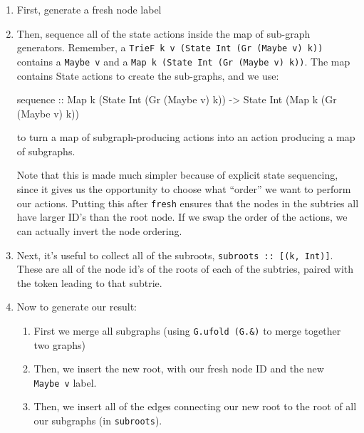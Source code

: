 \documentclass[]{article}
\newenvironment{Shaded}{}{}
\newcommand{\DataTypeTok}[1]{\textcolor[rgb]{0.56,0.13,0.00}{#1}}
\newcommand{\NormalTok}[1]{#1}
\newcommand{\OtherTok}[1]{\textcolor[rgb]{0.00,0.44,0.13}{#1}}
\begin{document}
\begin{enumerate}
\def\labelenumi{\arabic{enumi}.}
\item
  First, generate a fresh node label
\item
  Then, sequence all of the state actions inside the map of sub-graph
  generators. Remember, a
  \texttt{TrieF\ k\ v\ (State\ Int\ (Gr\ (Maybe\ v)\ k))} contains a
  \texttt{Maybe\ v} and a \texttt{Map\ k\ (State\ Int\ (Gr\ (Maybe\ v)\ k))}.
  The map contains State actions to create the sub-graphs, and we use:

\begin{Shaded}
\begin{Highlighting}[]
\NormalTok{sequence}
\OtherTok{    ::} \DataTypeTok{Map}\NormalTok{ k (}\DataTypeTok{State} \DataTypeTok{Int}\NormalTok{ (}\DataTypeTok{Gr}\NormalTok{ (}\DataTypeTok{Maybe}\NormalTok{ v) k))}
    \OtherTok{->} \DataTypeTok{State} \DataTypeTok{Int}\NormalTok{ (}\DataTypeTok{Map}\NormalTok{ k (}\DataTypeTok{Gr}\NormalTok{ (}\DataTypeTok{Maybe}\NormalTok{ v) k))}
\end{Highlighting}
\end{Shaded}

  to turn a map of subgraph-producing actions into an action producing a map of
  subgraphs.

  Note that this is made much simpler because of explicit state sequencing,
  since it gives us the opportunity to choose what ``order'' we want to perform
  our actions. Putting this after \texttt{fresh} ensures that the nodes in the
  subtries all have larger ID's than the root node. If we swap the order of the
  actions, we can actually invert the node ordering.
\item
  Next, it's useful to collect all of the subroots,
  \texttt{subroots\ ::\ {[}(k,\ Int){]}}. These are all of the node id's of the
  roots of each of the subtries, paired with the token leading to that subtrie.
\item
  Now to generate our result:

  \begin{enumerate}
  \def\labelenumii{\alph{enumii}.}
  \tightlist
  \item
    First we merge all subgraphs (using \texttt{G.ufold\ (G.\&)} to merge
    together two graphs)
  \item
    Then, we insert the new root, with our fresh node ID and the new
    \texttt{Maybe\ v} label.
  \item
    Then, we insert all of the edges connecting our new root to the root of all
    our subgraphs (in \texttt{subroots}).
  \end{enumerate}
\end{enumerate}
\end{document}
